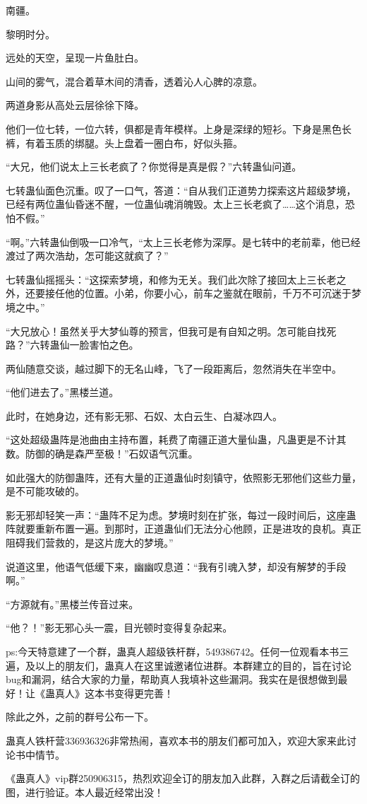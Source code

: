 \begin{this_body}
南疆。

黎明时分。

远处的天空，呈现一片鱼肚白。

山间的雾气，混合着草木间的清香，透着沁人心脾的凉意。

两道身影从高处云层徐徐下降。

他们一位七转，一位六转，俱都是青年模样。上身是深绿的短衫。下身是黑色长裤，有着玉质的绑腿。头上盘着一圈白布，好似头箍。

“大兄，他们说太上三长老疯了？你觉得是真是假？”六转蛊仙问道。

七转蛊仙面色沉重。叹了一口气，答道：“自从我们正道势力探索这片超级梦境，已经有两位蛊仙昏迷不醒，一位蛊仙魂消魄毁。太上三长老疯了……这个消息，恐怕不假。”

“啊。”六转蛊仙倒吸一口冷气，“太上三长老修为深厚。是七转中的老前辈，他已经渡过了两次浩劫，怎可能这就疯了？”

七转蛊仙摇摇头：“这探索梦境，和修为无关。我们此次除了接回太上三长老之外，还要接任他的位置。小弟，你要小心，前车之鉴就在眼前，千万不可沉迷于梦境之中。”

“大兄放心！虽然关乎大梦仙尊的预言，但我可是有自知之明。怎可能自找死路？”六转蛊仙一脸害怕之色。

两仙随意交谈，越过脚下的无名山峰，飞了一段距离后，忽然消失在半空中。

“他们进去了。”黑楼兰道。

此时，在她身边，还有影无邪、石奴、太白云生、白凝冰四人。

“这处超级蛊阵是池曲由主持布置，耗费了南疆正道大量仙蛊，凡蛊更是不计其数。防御的确是森严至极！”石奴语气沉重。

如此强大的防御蛊阵，还有大量的正道蛊仙时刻镇守，依照影无邪他们这些力量，是不可能攻破的。

影无邪却轻笑一声：“蛊阵不足为虑。梦境时刻在扩张，每过一段时间后，这座蛊阵就要重新布置一遍。到那时，正道蛊仙们无法分心他顾，正是进攻的良机。真正阻碍我们营救的，是这片庞大的梦境。”

说道这里，他语气低缓下来，幽幽叹息道：“我有引魂入梦，却没有解梦的手段啊。”

“方源就有。”黑楼兰传音过来。

“他？！”影无邪心头一震，目光顿时变得复杂起来。

ps:今天特意建了一个群，蛊真人超级铁杆群，549386742。任何一位观看本书三遍，及以上的朋友们，蛊真人在这里诚邀诸位进群。本群建立的目的，旨在讨论bug和漏洞，结合大家的力量，帮助真人我填补这些漏洞。我实在是很想做到最好！让《蛊真人》这本书变得更完善！

除此之外，之前的群号公布一下。

蛊真人铁杆营336936326非常热闹，喜欢本书的朋友们都可加入，欢迎大家来此讨论书中情节。

《蛊真人》vip群250906315，热烈欢迎全订的朋友加入此群，入群之后请截全订的图，进行验证。本人最近经常出没！

\end{this_body}

